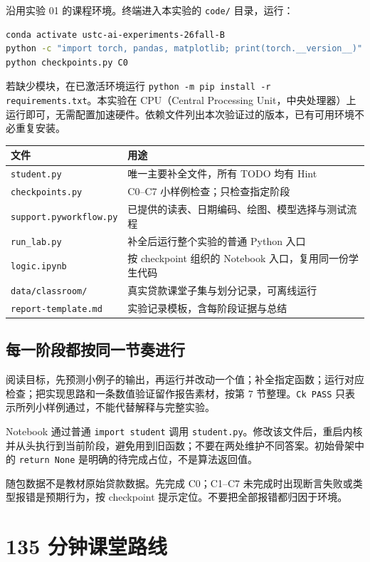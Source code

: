 \documentclass[UTF8,a4paper,11pt,fontset=fandol]{ctexart}
\newcommand{\file}[1]{\nolinkurl{#1}}
\begin{document}
沿用实验 01 的课程环境。终端进入本实验的 \file{code/} 目录，运行：
\begin{lstlisting}[language=bash]
conda activate ustc-ai-experiments-26fall-B
python -c "import torch, pandas, matplotlib; print(torch.__version__)"
python checkpoints.py C0
\end{lstlisting}
若缺少模块，在已激活环境运行 \texttt{python -m pip install -r requirements.txt}。本实验在 CPU（Central Processing Unit，中央处理器）上运行即可，无需配置加速硬件。依赖文件列出本次验证过的版本，已有可用环境不必重复安装。
\par\noindent\begin{tabularx}{\linewidth}{L{4.2cm}Y}\toprule
文件 & 用途\\\midrule
\file{student.py} & 唯一主要补全文件，所有 TODO 均有 Hint\\
\file{checkpoints.py} & C0--C7 小样例检查；只检查指定阶段\\
\file{support.py}\newline\file{workflow.py} & 已提供的读表、日期编码、绘图、模型选择与测试流程\\
\file{run_lab.py} & 补全后运行整个实验的普通 Python 入口\\
\file{logic.ipynb} & 按 checkpoint 组织的 Notebook 入口，复用同一份学生代码\\
\file{data/classroom/} & 真实贷款课堂子集与划分记录，可离线运行\\
\file{report-template.md} & 实验记录模板，含每阶段证据与总结\\\bottomrule
\end{tabularx}
\subsection{每一阶段都按同一节奏进行}
阅读目标，先预测小例子的输出，再运行并改动一个值；补全指定函数；运行对应检查；把实现思路和一条数值验证留作报告素材，按第 7 节整理。\texttt{Ck PASS} 只表示所列小样例通过，不能代替解释与完整实验。

Notebook 通过普通 \texttt{import student} 调用 \file{student.py}。修改该文件后，重启内核并从头执行到当前阶段，避免用到旧函数；不要在两处维护不同答案。初始骨架中的 \texttt{return None} 是明确的待完成占位，不是算法返回值。
\begin{pitfallbox}[不要跳过形状与数据来源]
随包数据不是教材原始贷款数据。先完成 C0；C1--C7 未完成时出现断言失败或类型报错是预期行为，按 checkpoint 提示定位。不要把全部报错都归因于环境。
\end{pitfallbox}
\clearpage
\section{135 分钟课堂路线}
\end{document}
